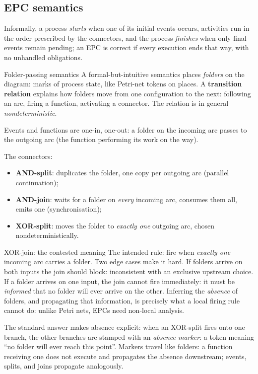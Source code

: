 \subsection{EPC semantics}

Informally, a process \emph{starts} when one of its initial events occurs, activities run in the order prescribed by the connectors, and the process \emph{finishes} when only final events remain pending; an EPC is correct if every execution ends that way, with no unhandled obligations.

\begin{definitionbox}{Folder-passing semantics}
A formal-but-intuitive semantics places \emph{folders} on the diagram: marks of process state, like Petri-net tokens on places. A \textbf{transition relation} explains how folders move from one configuration to the next: following an arc, firing a function, activating a connector. The relation is in general \emph{nondeterministic}.
\end{definitionbox}

Events and functions are one-in, one-out: a folder on the incoming arc passes to the outgoing arc (the function performing its work on the way).

The connectors:
\begin{itemize}
  \item \textbf{AND-split}: duplicates the folder, one copy per outgoing arc (parallel continuation);
  \item \textbf{AND-join}: waits for a folder on \emph{every} incoming arc, consumes them all, emits one (synchronisation);
  \item \textbf{XOR-split}: moves the folder to \emph{exactly one} outgoing arc, chosen nondeterministically.
\end{itemize}

\begin{notebox}{XOR-join: the contested meaning}
The intended rule: fire when \emph{exactly one} incoming arc carries a folder. Two edge cases make it hard. If folders arrive on both inputs the join should block: inconsistent with an exclusive upstream choice. If a folder arrives on one input, the join cannot fire immediately: it must be \emph{informed} that no folder will ever arrive on the other. Inferring the \emph{absence} of folders, and propagating that information, is precisely what a local firing rule cannot do: unlike Petri nets, EPCs need non-local analysis.
\end{notebox}

The standard answer makes absence explicit: when an XOR-split fires onto one branch, the other branches are stamped with an \emph{absence marker}: a token meaning ``no folder will ever reach this point''. Markers travel like folders: a function receiving one does not execute and propagates the absence downstream; events, splits, and joins propagate analogously.

